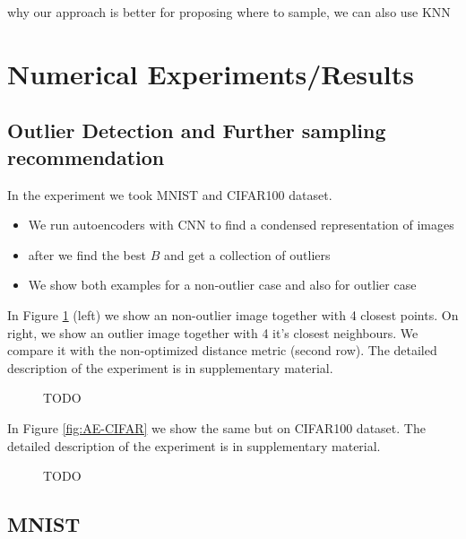 \documentclass{article}
\begin{document}
why our approach is better for proposing where to sample, we can also use KNN










\clearpage
 
\section{Numerical Experiments/Results}


\subsection{Outlier Detection and Further sampling recommendation}

In the experiment we took MNIST and CIFAR100 dataset.
\begin{itemize}
\item We run autoencoders with CNN to 
find a condensed representation of images
\item after we find the best $B$ and get a collection of outliers
\item We show both examples for a non-outlier case and also for outlier case
\end{itemize}


In Figure \ref{fig:AE-MNIST}
(left) we show an non-outlier image together with 4 closest points.
On right, we show an outlier image together with 4 it's closest neighbours.
We compare it with the non-optimized distance metric (second row). The detailed description of the experiment is in supplementary material.
\begin{figure}[h!]

\caption{TODO}
\label{fig:AE-MNIST}

\end{figure}

In Figure \eqref{fig:AE-CIFAR}
we show the same but on CIFAR100 dataset.
The detailed description of the experiment is in supplementary material.
\begin{figure}[h!]

\caption{TODO}
\label{fig:AE-CIFAR}

\end{figure}

 
 \clearpage 

\subsection{MNIST}
\end{document}

